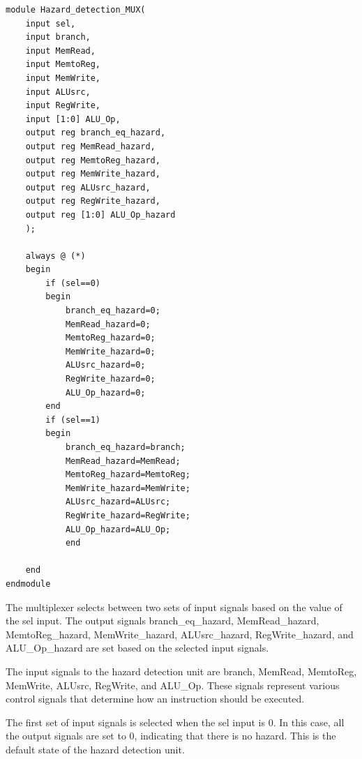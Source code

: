 \documentclass{article}
\begin{document}
\begin{lstlisting}[caption={Hazard Detection MUX}, captionpos=b, language=RISC-V]
module Hazard_detection_MUX(
    input sel,
    input branch,
    input MemRead,
    input MemtoReg,
    input MemWrite,
    input ALUsrc,
    input RegWrite,
    input [1:0] ALU_Op,
    output reg branch_eq_hazard,
    output reg MemRead_hazard,
    output reg MemtoReg_hazard,
    output reg MemWrite_hazard,
    output reg ALUsrc_hazard,
    output reg RegWrite_hazard,
    output reg [1:0] ALU_Op_hazard
    );

    always @ (*)
    begin
        if (sel==0)
        begin
            branch_eq_hazard=0;
            MemRead_hazard=0;
            MemtoReg_hazard=0;
            MemWrite_hazard=0;
            ALUsrc_hazard=0;
            RegWrite_hazard=0;
            ALU_Op_hazard=0;
        end 
        if (sel==1)
        begin
            branch_eq_hazard=branch;
            MemRead_hazard=MemRead;
            MemtoReg_hazard=MemtoReg;
            MemWrite_hazard=MemWrite;
            ALUsrc_hazard=ALUsrc;
            RegWrite_hazard=RegWrite;
            ALU_Op_hazard=ALU_Op;
            end 
        
    end 
endmodule
\end{lstlisting}

The multiplexer selects between two sets of input signals based on the value of the sel input. The output signals branch\_eq\_hazard, MemRead\_hazard, MemtoReg\_hazard, MemWrite\_hazard, ALUsrc\_hazard, RegWrite\_hazard, and ALU\_Op\_hazard are set based on the selected input signals.

The input signals to the hazard detection unit are branch, MemRead, MemtoReg, MemWrite, ALUsrc, RegWrite, and ALU\_Op. These signals represent various control signals that determine how an instruction should be executed.

The first set of input signals is selected when the sel input is 0. In this case, all the output signals are set to 0, indicating that there is no hazard. This is the default state of the hazard detection unit.
\end{document}
